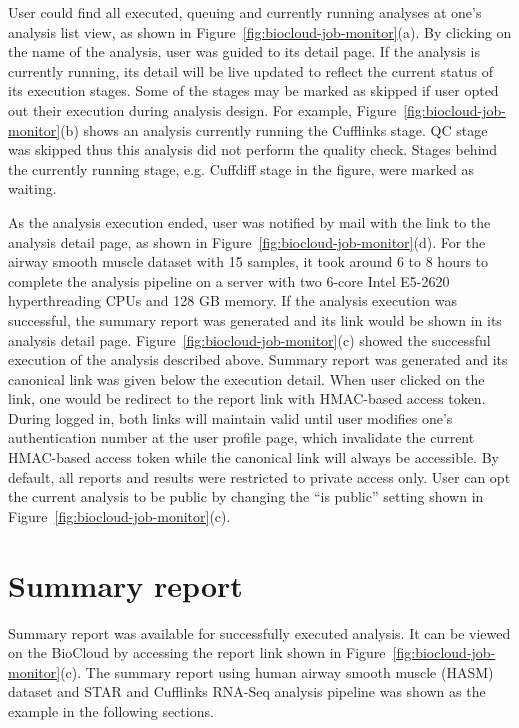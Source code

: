 


User could find all executed, queuing and currently running analyses at one's
analysis list view, as shown in Figure~\ref{fig:biocloud-job-monitor}(a). By
clicking on the name of the analysis, user was guided to its detail page. If
the analysis is currently running, its detail will be live updated to reflect
the current status of its execution stages. Some of the stages may be marked as
skipped if user opted out their execution during analysis design. For example,
Figure~\ref{fig:biocloud-job-monitor}(b) shows an analysis currently running
the Cufflinks stage. QC stage was skipped thus this analysis did not perform
the quality check. Stages behind the currently running stage, e.g. Cuffdiff
stage in the figure, were marked as waiting.

As the analysis execution ended, user was notified by mail with the link to the
analysis detail page, as shown in Figure~\ref{fig:biocloud-job-monitor}(d). For
the airway smooth muscle dataset with 15 samples, it took around 6 to 8 hours
to complete the analysis pipeline on a server with two 6-core Intel E5-2620
hyperthreading CPUs and 128 GB memory. If the analysis execution was
successful, the summary report was generated and its link would be shown in its
analysis detail page.  Figure~\ref{fig:biocloud-job-monitor}(c) showed the
successful execution of the analysis described above. Summary report was
generated and its canonical link was given below the execution detail. When
user clicked on the link, one would be redirect to the report link with
HMAC-based access token. During logged in, both links will maintain valid until
user modifies one's authentication number at the user profile page, which
invalidate the current HMAC-based access token while the canonical link will
always be accessible. By default, all reports and results were restricted to
private access only. User can opt the current analysis to be public by changing
the ``is public'' setting shown in Figure~\ref{fig:biocloud-job-monitor}(c).



\section{Summary report}

Summary report was available for successfully executed analysis. It can be
viewed on the BioCloud by accessing the report link shown in
Figure~\ref{fig:biocloud-job-monitor}(c). The summary report using human airway
smooth muscle (HASM) dataset and STAR and Cufflinks RNA-Seq analysis pipeline
was shown as the example in the following sections.

